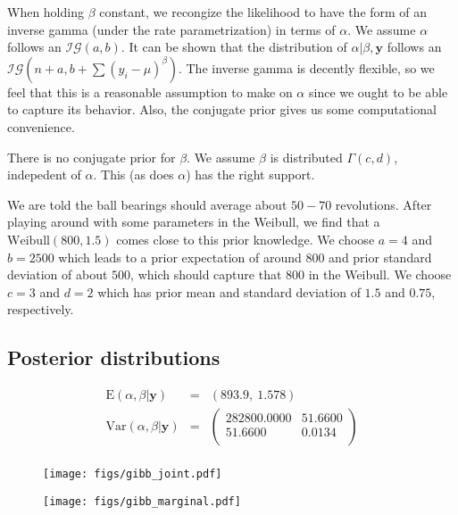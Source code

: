 \documentclass[12pt]{article}
\newcommand{\m}[1]{\mathbf{\bm{#1}}}
\begin{document}
\noindent When holding $\beta$ constant, we recongize the likelihood to have the form of an inverse gamma (under the rate parametrization) in terms of $\alpha$. We assume $\alpha$ follows an $\mathcal{IG}(a, b)$. It can be shown that the distribution of $\alpha|\beta,\m{y}$ follows an $\mathcal{IG}(n+a,b+\sum(y_i-\mu)^\beta)$. The inverse gamma is decently flexible, so we feel that this is a reasonable assumption to make on $\alpha$ since we ought to be able to capture its behavior. Also, the conjugate prior gives us some computational convenience.
\bigskip

\noindent There is no conjugate prior for $\beta$. We assume $\beta$ is distributed $\Gamma(c, d)$, indepedent of $\alpha$. This (as does $\alpha$) has the right support.
\bigskip

\noindent We are told the ball bearings should average about $50-70$ revolutions. After playing around with some parameters in the Weibull, we find that a $\mathrm{Weibull}(800, 1.5)$ comes close to this prior knowledge. We choose $a=4$ and $b=2500$ which leads to a prior expectation of around $800$ and prior standard deviation of about $500$, which should capture that $800$ in the Weibull. We choose $c=3$ and $d=2$ which has prior mean and standard deviation of $1.5$ and $0.75$, respectively.

\subsection{Posterior distributions}

\begin{eqnarray*}
\mathrm{E}(\alpha, \beta|\m{y}) &=& (893.9,~1.578) \\
\mathrm{Var}(\alpha, \beta|\m{y}) &=& \left(\begin{array}{rr} 282800.0000 & 51.6600 \\ 51.6600 & 0.0134 \\ \end{array}\right) \\
\end{eqnarray*}

\begin{figure}[H]
    \centering
    \texttt{[image: figs/gibb\_joint.pdf]}
\end{figure}

\begin{figure}[H]
    \centering
    \texttt{[image: figs/gibb\_marginal.pdf]}
\end{figure}
\end{document}
